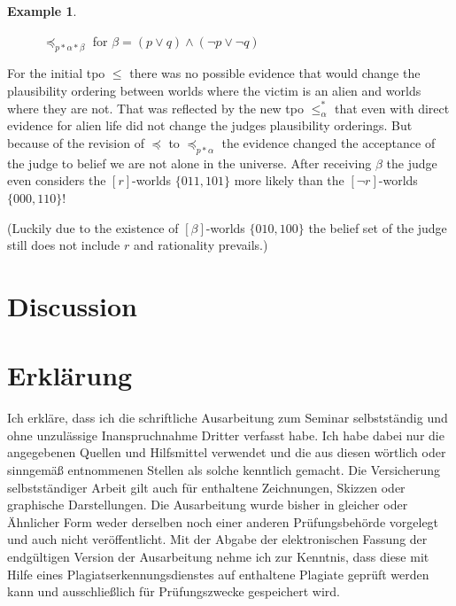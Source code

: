 \documentclass[english, 12pt]{scrartcl}
\theoremstyle{definition}
\newtheorem{example}{Example}[section]
\theoremstyle{definition}
\theoremstyle{definition}
\begin{document}
\begin{example}
\begin{figure}[h]
            \caption{$\preceq_{p \ast \alpha \ast \beta}$ for $\beta = (p \vee q) \wedge (\neg p \vee \neg q)$}
            \label{fig:example-preceq-revised-alien2}
    \end{figure}
    
For the initial tpo $\leq$ there was no possible evidence that would change the plausibility ordering between worlds where the victim is an alien and worlds where they are not. That was reflected by the new tpo $\leq_{\alpha}^{\ast}$ that even with direct evidence for alien life did not change the judges plausibility orderings. But because of the revision of $\preceq$ to $\preceq_{p \ast \alpha}$ the evidence changed the acceptance of the judge to belief we are not alone in the universe. After receiving $\beta$ the judge even considers the $[r]$-worlds $\{011, 101\}$ more likely than the $[\neg r]$-worlds $\{000, 110\}$!

(Luckily due to the existence of $[\beta]$-worlds $\{010, 100\}$ the belief set of the judge still does not include $r$ and rationality prevails.)
\end{example}

\section{Discussion}
\newpage

\typeout{}



\newpage

\section*{Erklärung}
Ich erkläre, dass ich die schriftliche Ausarbeitung zum Seminar selbstständig und ohne unzulässige Inanspruchnahme Dritter verfasst habe. Ich habe dabei nur die angegebenen Quellen und Hilfsmittel verwendet und die aus diesen wörtlich oder sinngemäß entnommenen Stellen als solche kenntlich gemacht. Die Versicherung selbstständiger Arbeit gilt auch für enthaltene Zeichnungen, Skizzen oder graphische Darstellungen. Die Ausarbeitung wurde bisher in gleicher oder Ähnlicher Form weder derselben noch einer anderen Prüfungsbehörde vorgelegt und auch nicht veröffentlicht. Mit der Abgabe der elektronischen Fassung der endgültigen Version der Ausarbeitung nehme ich zur Kenntnis, dass diese mit Hilfe eines Plagiatserkennungsdienstes auf enthaltene Plagiate geprüft werden kann und ausschließlich für Prüfungszwecke gespeichert wird.
\end{document}
